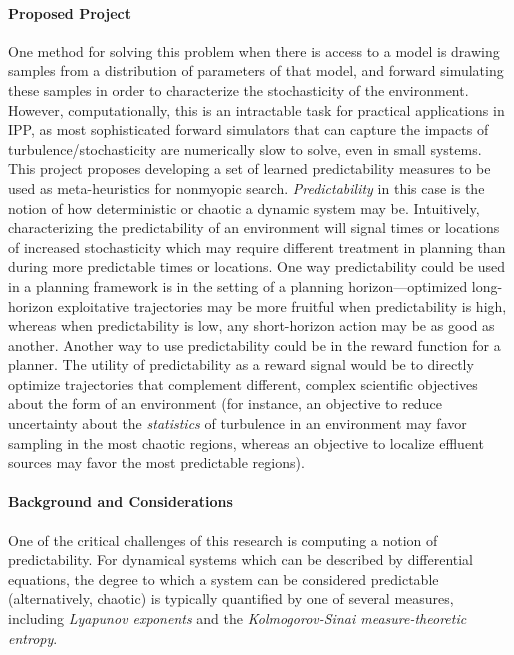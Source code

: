 \paragraph{Proposed Project} 
One method for solving this problem when there is access to a model is drawing samples from a distribution of parameters of that model, and forward simulating these samples in order to characterize the stochasticity of the environment.
However, computationally, this is an intractable task for practical applications in IPP, as most sophisticated forward simulators that can capture the impacts of turbulence/stochasticity are numerically slow to solve, even in small systems.
This project proposes developing a set of learned predictability measures to be used as  meta-heuristics for nonmyopic search.
\emph{Predictability} in this case is the notion of how deterministic or chaotic a dynamic system may be.
Intuitively, characterizing the predictability of an environment will signal times or locations of increased stochasticity which may require different treatment in planning than during more predictable times or locations.
One way predictability could be used in a planning framework is in the setting of a planning horizon---optimized long-horizon exploitative trajectories may be more fruitful when predictability is high, whereas when predictability is low, any short-horizon action may be as good as another.
Another way to use predictability could be in the reward function for a planner. The utility of predictability as a reward signal would be to directly optimize trajectories that complement different, complex scientific objectives about the form of an environment (for instance, an objective to reduce uncertainty about the \emph{statistics} of turbulence in an environment may favor sampling in the most chaotic regions, whereas an objective to localize effluent sources may favor the most predictable regions).

\paragraph{Background and Considerations}
One of the critical challenges of this research is computing a notion of predictability.
For dynamical systems which can be described by differential equations, the degree to which a system can be considered predictable (alternatively, chaotic) is typically quantified by one of several measures, including \emph{Lyapunov exponents}\autocite{wolf1985determining} and the \emph{Kolmogorov-Sinai measure-theoretic entropy}\autocite{frigg2004sense}.

